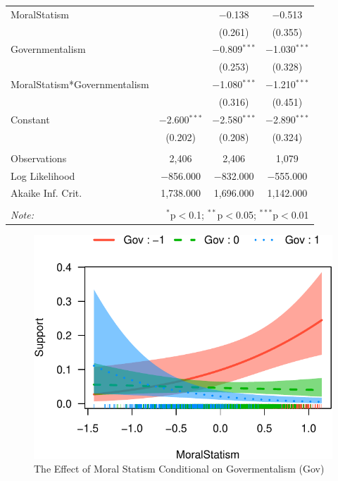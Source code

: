 \documentclass[12pt,]{article}
\begin{document}
\begin{table}[!htbp]
\begin{tabular}{@{\extracolsep{5pt}}lccc}
  MoralStatism &  & $-$0.138 & $-$0.513 \\ 
  &  & (0.261) & (0.355) \\ 
  Governmentalism &  & $-$0.809$^{***}$ & $-$1.030$^{***}$ \\ 
  &  & (0.253) & (0.328) \\ 
  MoralStatism*Governmentalism &  & $-$1.080$^{***}$ & $-$1.210$^{***}$ \\ 
  &  & (0.316) & (0.451) \\ 
  Constant & $-$2.600$^{***}$ & $-$2.580$^{***}$ & $-$2.890$^{***}$ \\ 
  & (0.202) & (0.208) & (0.324) \\ 
 \hline \\[-1.8ex] 
Observations & 2,406 & 2,406 & 1,079 \\ 
Log Likelihood & $-$856.000 & $-$832.000 & $-$555.000 \\ 
Akaike Inf. Crit. & 1,738.000 & 1,696.000 & 1,142.000 \\ 
\hline 
\hline \\[-1.8ex] 
\textit{Note:}  & \multicolumn{3}{r}{$^{*}$p$<$0.1; $^{**}$p$<$0.05; $^{***}$p$<$0.01} \\ 
\end{tabular} 
\end{table}

\pagebreak

\doublespacing

\begin{figure}[htbp]
\centering
\includegraphics{figures/effect-plot1-1.pdf}
\caption{The Effect of Moral Statism Conditional on Govermentalism
(Gov)}
\end{figure}
\end{document}
